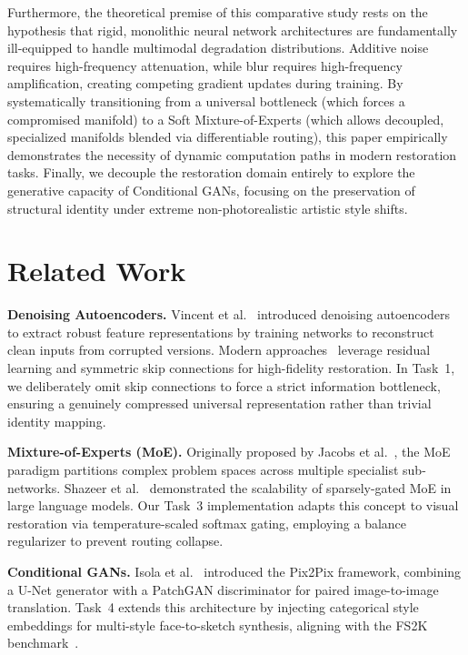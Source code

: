 \documentclass[conference]{IEEEtran}
\begin{document}
Furthermore, the theoretical premise of this comparative study rests on the hypothesis that rigid, monolithic neural network architectures are fundamentally ill-equipped to handle multimodal degradation distributions. Additive noise requires high-frequency attenuation, while blur requires high-frequency amplification, creating competing gradient updates during training. By systematically transitioning from a universal bottleneck (which forces a compromised manifold) to a Soft Mixture-of-Experts (which allows decoupled, specialized manifolds blended via differentiable routing), this paper empirically demonstrates the necessity of dynamic computation paths in modern restoration tasks. Finally, we decouple the restoration domain entirely to explore the generative capacity of Conditional GANs, focusing on the preservation of structural identity under extreme non-photorealistic artistic style shifts.

\section{Related Work}
\textbf{Denoising Autoencoders.} Vincent et al.~\cite{vincent2008extracting} introduced denoising autoencoders to extract robust feature representations by training networks to reconstruct clean inputs from corrupted versions. Modern approaches~\cite{zhang2017beyond,mao2016image} leverage residual learning and symmetric skip connections for high-fidelity restoration. In Task~1, we deliberately omit skip connections to force a strict information bottleneck, ensuring a genuinely compressed universal representation rather than trivial identity mapping.

\textbf{Mixture-of-Experts (MoE).} Originally proposed by Jacobs et al.~\cite{jacobs1991adaptive}, the MoE paradigm partitions complex problem spaces across multiple specialist sub-networks. Shazeer et al.~\cite{shazeer2017outrageously} demonstrated the scalability of sparsely-gated MoE in large language models. Our Task~3 implementation adapts this concept to visual restoration via temperature-scaled softmax gating, employing a balance regularizer to prevent routing collapse.

\textbf{Conditional GANs.} Isola et al.~\cite{isola2017pix2pix} introduced the Pix2Pix framework, combining a U-Net generator with a PatchGAN discriminator for paired image-to-image translation. Task~4 extends this architecture by injecting categorical style embeddings for multi-style face-to-sketch synthesis, aligning with the FS2K benchmark~\cite{fan2022fs2k}.
\end{document}
